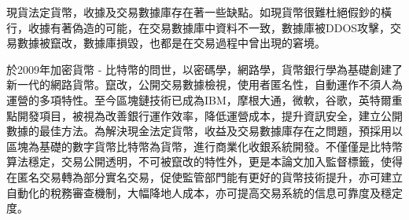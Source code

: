 
現貨法定貨幣，收據及交易數據庫存在著一些缺點。如現貨幣很難杜絕假鈔的橫行，收據有著偽造的可能，在交易數據庫中資料不一致，數據庫被DDOS攻擊，交易數據被竄改，數據庫損毀，也都是在交易過程中曾出現的窘境。

於2009年加密貨幣 - 比特幣的問世，以密碼學，網路學，貨幣銀行學為基礎創建了新一代的網路貨幣。竄改，公開交易數據檢視，使用者匿名性，自動運作不須人為運營的多項特性。至今區塊鏈技術已成為IBM，摩根大通，微軟，谷歌，英特爾重點開發項目，被視為改善銀行運作效率，降低運營成本，提升資訊安全，建立公開數據的最佳方法。為解決現金法定貨幣，收益及交易數據庫存在之問題，預採用以區塊為基礎的數字貨幣比特幣為貨幣，進行商業化收銀系統開發。不僅僅是比特幣算法穩定，交易公開透明，不可被竄改的特性外，更是本論文加入監督標籤，使得在匿名交易轉為部分實名交易，促使監管部門能有更好的貨幣技術提升，亦可建立自動化的稅務審查機制，大幅降地人成本，亦可提高交易系統的信息可靠度及穩定度。
